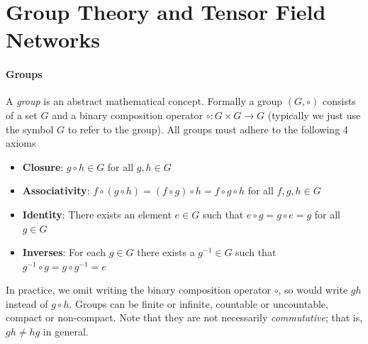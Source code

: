 \newpage
\appendix

\section{Group Theory and Tensor Field Networks}
\paragraph{Groups}
A \emph{group} is an abstract mathematical concept. Formally a group $(G,\circ)$ consists of a set $G$ and a binary composition operator $\circ: G \times G \to G$ (typically we just use the symbol $G$ to refer to the group). All groups must adhere to the following 4 axioms
\begin{itemize}
    \item \textbf{Closure}: $g\circ h \in G$ for all $g, h \in G$
    \item \textbf{Associativity}: $f \circ (g \circ h) = (f \circ g) \circ h = f \circ g \circ h$ for all $f, g, h \in G$
    \item \textbf{Identity}: There exists an element $e \in G$ such that $e \circ g = g \circ e = g$ for all $g \in G$
    \item \textbf{Inverses}: For each $g \in G$ there exists a $g^{-1} \in G$ such that $g^{-1} \circ g = g \circ g^{-1} = e$
\end{itemize}
In practice, we omit writing the binary composition operator $\circ$, so would write $gh$ instead of $g \circ h$. Groups can be finite or infinite, countable or uncountable, compact or non-compact. Note that they are not necessarily \emph{commutative}; that is, $gh \neq hg$ in general.

